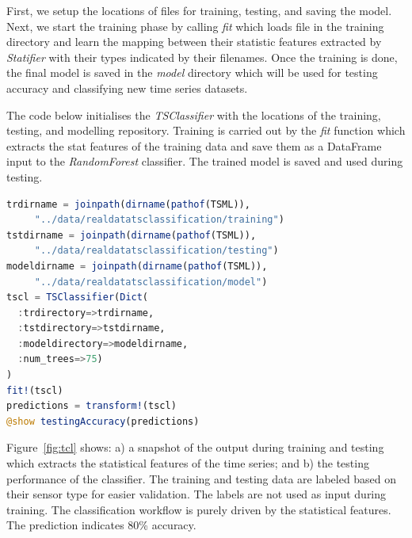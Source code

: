 \documentclass{juliacon}
\begin{document}
\vskip 6pt
First, we setup the locations of files for training, testing, and saving the model.
Next, we start the training phase by calling \emph{fit} which loads
file in the training directory and learn the mapping between their
statistic features extracted by \emph{Statifier} with their types indicated
by their filenames. Once the training is done, the final model
is saved in the \emph{model} directory which will be used for 
testing accuracy and classifying new time series datasets. 

The code below initialises the \emph{TSClassifier} with the locations of the training, testing, and modelling repository. Training is carried out by the \emph{fit} function which extracts the stat features of the training data and save them as a DataFrame input to the \emph{RandomForest} classifier. The trained model is saved and used during testing.

\begin{lstlisting}[language = Julia]
trdirname = joinpath(dirname(pathof(TSML)),
     "../data/realdatatsclassification/training")
tstdirname = joinpath(dirname(pathof(TSML)),
     "../data/realdatatsclassification/testing")
modeldirname = joinpath(dirname(pathof(TSML)),
     "../data/realdatatsclassification/model")
tscl = TSClassifier(Dict(
  :trdirectory=>trdirname,
  :tstdirectory=>tstdirname,
  :modeldirectory=>modeldirname,
  :num_trees=>75)
)
fit!(tscl)
predictions = transform!(tscl)
@show testingAccuracy(predictions)
\end{lstlisting}

Figure~\ref{fig:tcl} shows: a) a snapshot of the output during training and testing which extracts the statistical features of the time series; and b) the testing performance of the classifier. The training and testing data are labeled based on their sensor type for easier validation. The labels are not used as input during training. The classification workflow is purely driven by the statistical features. The prediction indicates 80\% accuracy.
\end{document}
